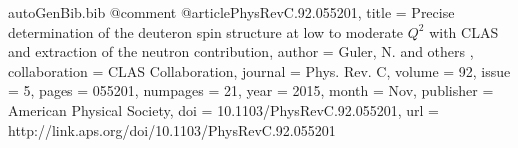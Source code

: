 \begin{filecontents*}{autoGenBib.bib}
@comment %
@article{PhysRevC.92.055201,
  title = {Precise determination of the deuteron spin structure at low to moderate ${Q}^{2}$ with CLAS and extraction of the neutron contribution},
  author = {Guler, N. and others }, 
  collaboration = {CLAS Collaboration},
  journal = {Phys. Rev. C},
  volume = {92},
  issue = {5},
  pages = {055201},
  numpages = {21},
  year = {2015},
  month = {Nov},
  publisher = {American Physical Society},
  doi = {10.1103/PhysRevC.92.055201},
  url = {http://link.aps.org/doi/10.1103/PhysRevC.92.055201}
}



\end{filecontents*}
